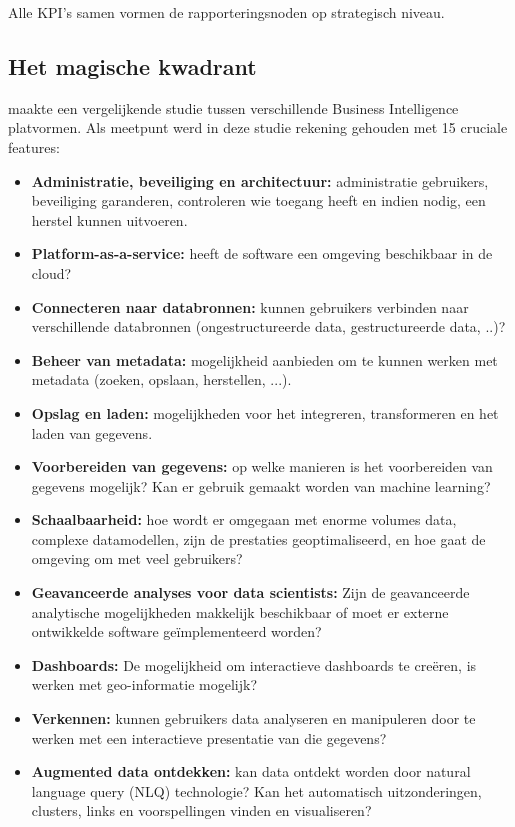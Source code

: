 Alle KPI's samen vormen de rapporteringsnoden op strategisch niveau.

\subsection{Het magische kwadrant}
\textcite{Gartner2019} maakte een vergelijkende studie tussen verschillende Business Intelligence platvormen. Als meetpunt werd in deze studie rekening gehouden met 15 cruciale features:
\begin{itemize}
	\item \textbf{Administratie, beveiliging en architectuur:} administratie gebruikers, beveiliging garanderen, controleren wie toegang heeft en indien nodig, een herstel kunnen uitvoeren.
	\item \textbf{Platform-as-a-service:} heeft de software een omgeving beschikbaar in de cloud?
	\item \textbf{Connecteren naar databronnen:} kunnen gebruikers verbinden naar verschillende databronnen (ongestructureerde data, gestructureerde data, ..)?
	\item \textbf{Beheer van metadata:} mogelijkheid aanbieden om te kunnen werken met metadata (zoeken, opslaan, herstellen, ...).
	\item \textbf{Opslag en laden:} mogelijkheden voor het integreren, transformeren en het laden van gegevens.
	\item \textbf{Voorbereiden van gegevens:}  op welke manieren is het voorbereiden van gegevens mogelijk? Kan er gebruik gemaakt worden van machine learning?
	\item \textbf{Schaalbaarheid:} hoe wordt er omgegaan met enorme volumes data, complexe datamodellen, zijn de prestaties geoptimaliseerd, en hoe gaat de omgeving om met veel gebruikers?
	\item \textbf{Geavanceerde analyses voor data scientists:} Zijn de geavanceerde analytische mogelijkheden makkelijk beschikbaar of moet er externe ontwikkelde software geïmplementeerd worden?
	\item \textbf{Dashboards:} De mogelijkheid om interactieve dashboards te creëren, is werken met geo-informatie mogelijk?
	\item \textbf{Verkennen:} kunnen gebruikers data analyseren en manipuleren door te werken met een interactieve presentatie van die gegevens?
	\item \textbf{Augmented data ontdekken:} kan data ontdekt worden door natural language query (NLQ) technologie? Kan het automatisch uitzonderingen, clusters, links en voorspellingen vinden en visualiseren?

\end{itemize}
